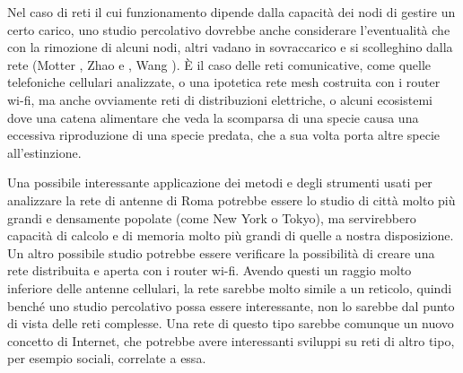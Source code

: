 Nel caso di reti il cui funzionamento dipende dalla capacità dei nodi di gestire un certo carico, uno studio percolativo dovrebbe anche considerare l'eventualità che con la rimozione di alcuni nodi, altri vadano in sovraccarico e si scolleghino dalla rete (Motter \citeyear{Motter2002}, Zhao \citeyear{Zhao2004} e \citeyear{Zhao2005}, Wang \citeyear{Wang2009}). È il caso delle reti comunicative, come quelle telefoniche cellulari analizzate, o una ipotetica rete mesh costruita con i router wi-fi, ma anche ovviamente reti di distribuzioni elettriche, 
o alcuni ecosistemi dove una catena alimentare che veda la scomparsa di una specie causa una eccessiva riproduzione di una specie predata, che a sua volta porta altre specie all'estinzione.

Una possibile interessante applicazione dei metodi e degli strumenti usati per analizzare la rete di antenne di Roma potrebbe essere lo studio di città molto più grandi e densamente popolate (come New York o Tokyo), ma servirebbero capacità di calcolo e di memoria molto più grandi di quelle a nostra disposizione. Un altro possibile studio potrebbe essere verificare la possibilità di creare una rete distribuita e aperta con i router wi-fi. Avendo questi un raggio molto inferiore delle antenne cellulari, la rete sarebbe molto simile a un reticolo, quindi benché uno studio percolativo possa essere interessante, non lo sarebbe dal punto di vista delle reti complesse. 
Una rete di questo tipo sarebbe comunque un nuovo concetto di Internet, che potrebbe avere interessanti sviluppi su reti di altro tipo, per esempio sociali, correlate a essa.